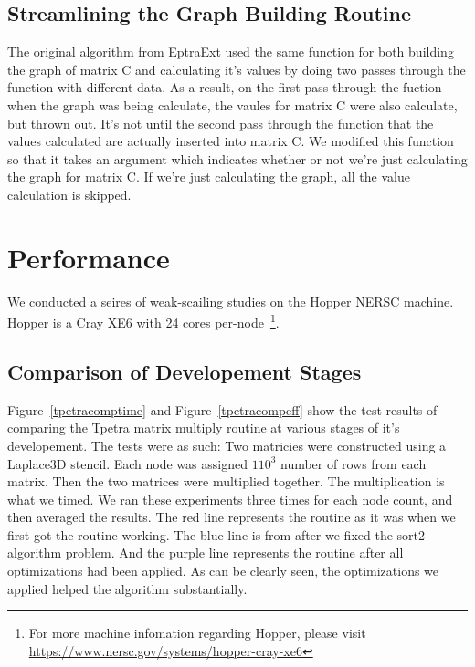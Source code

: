 \documentclass{article}
\begin{document}
\subsection{Streamlining the Graph Building Routine}
The original algorithm from EptraExt used the same function for both building the graph of matrix C and calculating it's 
values by doing two passes through the function with different data. 
As a result, on the first pass through the fuction when the graph was being calculate, the vaules for matrix C were also 
calculate, but thrown out. It's not until the second pass through the function 
that the values calculated are actually inserted into matrix C. We modified this function so that it
takes an argument which indicates whether or not we're just calculating the graph for matrix C. If we're just calculating 
the graph, all the value calculation is skipped.

\section{Performance}
We conducted a seires of weak-scailing studies on the Hopper NERSC machine. Hopper is a Cray XE6 with 24 cores
per-node~\footnote{For more machine infomation regarding Hopper, please visit \url{https://www.nersc.gov/systems/hopper-cray-xe6}}.

\subsection{Comparison of Developement Stages}
Figure~\ref{tpetracomptime} and Figure~\ref{tpetracompeff} show the test results of comparing the Tpetra matrix multiply 
routine at various stages of it's 
developement.  The tests were as such: Two matricies were constructed using a Laplace3D stencil. Each node was assigned 
$110^3$ number of rows from each matrix. Then the two matrices were multiplied together. The multiplication is what 
we timed. We ran these experiments three times for each node count, and then averaged the results.
The red line represents the routine as it was when we first got the routine working. The blue line is from after 
we fixed the sort2 algorithm problem. And the purple line represents the routine after all optimizations had been applied.
As can be clearly seen, the optimizations we applied helped the algorithm substantially.
\end{document}
